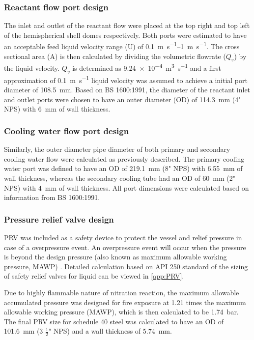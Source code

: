 \subsubsection{Reactant flow port design}
The inlet and outlet of the reactant flow were placed at the top right and top left of the hemispherical shell domes respectively. Both ports were estimated to have an acceptable feed liquid velocity range (U) of \SIrange{0.1}{1}{\m\per\s}. The cross sectional area (A) is then calculated by dividing the volumetric flowrate ($Q_v$) by the liquid velocity. $Q_v$ is determined as \SI{9.24e-4}{\cubic\m\per\s} and a first approximation of \SI{0.1}{\m\per\s} liquid velocity was assumed to achieve a initial port diameter of \SI{108.5}{\milli \metre}. Based on BS 1600:1991, the diameter of the reactant inlet and outlet ports were chosen to have an outer diameter (OD) of \SI{114.3}{\milli \metre} (4" NPS) with \SI{6}{\milli \metre} of wall thickness. 

\subsubsection{Cooling water flow port design}
Similarly, the outer diameter pipe diameter of both primary and secondary cooling water flow were calculated as previously described. The primary cooling water port was defined to have an OD of \SI{219.1}{\milli \metre} (8" NPS) with \SI{6.55}{\milli \metre} of wall thickness, whereas the secondary cooling tube had an OD of \SI{60}{\milli \metre} (2" NPS) with \SI{4}{\milli \metre} of wall thickness. All port dimensions were calculated based on information from BS 1600:1991. 

\subsubsection{Pressure relief valve design}
PRV was included as a safety device to protect the vessel and relief pressure in case of a overpressure event. An overpressure event will occur when the pressure is beyond the design pressure (also known as maximum allowable working pressure, MAWP) \cite{marsha_lecture_nodate}. Detailed calculation based on API 250 standard \cite{api_standard_520_sizing_2013} of the sizing of safety relief valves for liquid can be viewed in \ref{app:PRV}.

Due to highly flammable nature of nitration reaction, the maximum allowable accumulated pressure was designed for fire exposure at 1.21 times the maximum allowable working pressure (MAWP), which is then calculated to be \SI{1.74}{\bar}. The final PRV size for schedule 40 steel was calculated to have an OD of \SI{101.6}{\milli \metre} (3 $\frac{1}{2}$" NPS) and a wall thickness of \SI{5.74}{\milli \metre}.

